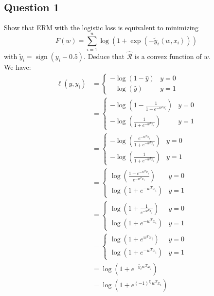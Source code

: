 \documentclass{article}
\newcommand{\1}{\mathbf{1}}
\newcommand{\Rcal}{\mathcal{R}}
\begin{document}
\subsection{Question 1}
Show that ERM with the logistic loss is equivalent to minimizing
\begin{equation*}
  F(w) = \sum_{i=1}^{n} \log \left( 1 + \exp \left( - \tilde{y}_{i}\left\langle w, x_{i}\right\rangle\right)\right)
\end{equation*}
with \(\tilde{y}_i = \operatorname{sign}(y_i - 0.5)\). Deduce that \(\hat{\Rcal}\) is a convex function of \(w\). \\
We have:
\begin{align*}
  \ell \left(y, y_i\right)
   & =
  \begin{cases}
    - \log (1 - \hat y) & y = 0 \\
    - \log (\hat y)     & y = 1
  \end{cases}                      \\
   & =
  \begin{cases}
    - \log \left(1 - \frac{1}{1 + e^{-w^T x_i}}\right) & y = 0 \\
    - \log \left(\frac{1}{1 + e^{-w^T x_i}}\right)     & y = 1
  \end{cases}                      \\
   & =
  \begin{cases}
    - \log \left(\frac{e^{-w^T x_i}}{1 + e^{-w^T x_i}}\right) & y = 0 \\
    - \log \left(\frac{1}{1 + e^{-w^T x_i}}\right)            & y = 1
  \end{cases}                      \\
   & =
  \begin{cases}
    \log \left(\frac{1 + e^{-w^T x_i}}{e^{-w^T x_i}}\right) & y = 0 \\
    \log \left( 1 + e^{-w^T x_i} \right)                    & y = 1
  \end{cases}                      \\
   & =
  \begin{cases}
    \log \left( 1 + \frac{1}{e^{-w^T x_i}}\right) & y = 0 \\
    \log \left( 1 + e^{-w^T x_i} \right)          & y = 1
  \end{cases}                      \\
   & =
  \begin{cases}
    \log \left(1 + e^{w^T x_i} \right)   & y = 0 \\
    \log \left( 1 + e^{-w^T x_i} \right) & y = 1
  \end{cases}                      \\
   & =
  \log \left(1 + e^{-\tilde{y_i} w^T x_i} \right) \\
   & =
  \log \left(1 + e^{(-1)^{y_i} w^T x_i} \right)   \\
\end{align*}
\end{document}
